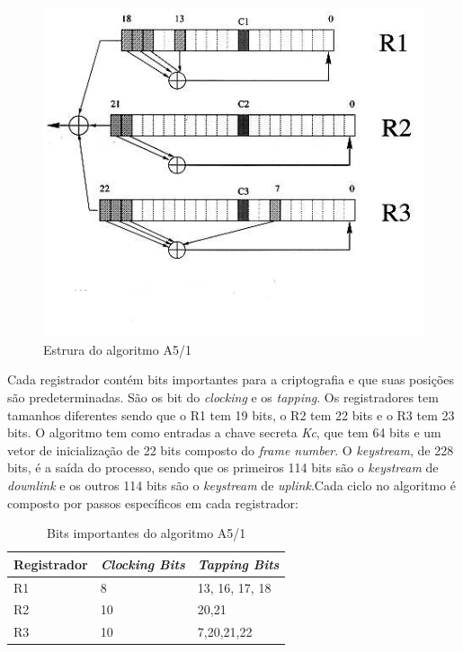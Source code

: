 \begin{figure}[h]
\centering
\includegraphics[keepaspectratio=true,scale=0.7]
    {figuras/a5_1.eps}
    \caption[Estrura do algoritmo A5/1]{Estrura do algoritmo A5/1\protect\footnotemark} 
\end{figure}

Cada registrador contém bits importantes para a criptografia e que suas posições são predeterminadas. São os bit do \textit{clocking} e os \textit{tapping}. Os registradores tem tamanhos diferentes sendo que o R1 tem 19 bits, o R2 tem 22 bits e o R3 tem 23 bits. O algoritmo tem como entradas a chave secreta \textit{Kc}, que tem 64 bits e um vetor de inicialização de 22 bits composto do \textit{frame number}. O \textit{keystream}, de 228 bits, é a saída do processo, sendo que os primeiros 114 bits são o \textit{keystream} de \textit{downlink} e os outros 114 bits são o \textit{keystream} de \textit{uplink}.Cada ciclo no algoritmo é composto por passos específicos em cada registrador:

\begin{table}[h]
\centering
	\begin{tabular}{|l|l|l|}
		\hline
		Registrador & \textit{Clocking Bits} & \textit{Tapping Bits} \\ \hline
		R1 & 8 & 13, 16, 17, 18 \\ \hline
		R2 & 10 & 20,21 \\ \hline
		R3 & 10 & 7,20,21,22 \\ \hline	
	\end{tabular}
	\caption{Bits importantes do algoritmo A5/1}
\end{table}


